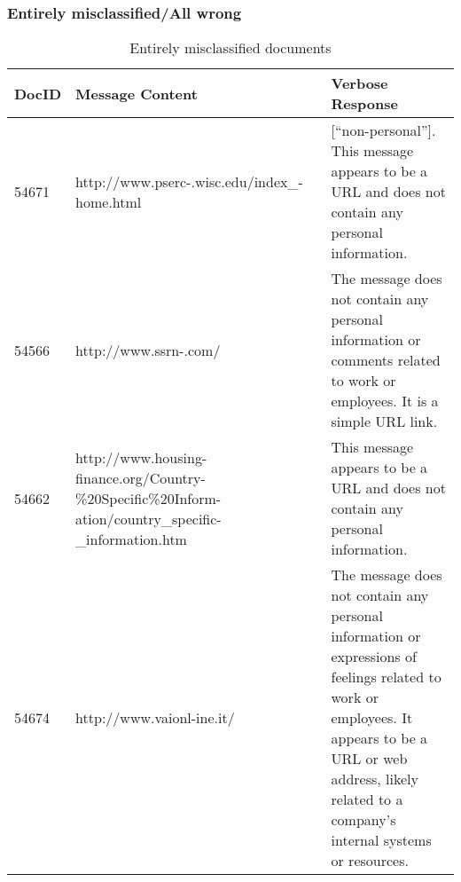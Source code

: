 \subsubsection{Entirely misclassified/All wrong} 
\begin{table}[!htb]
\caption{Entirely misclassified documents}
\label{table:all_wrong}
\begin{tabular}{@{}p{0.25in}p{1.2in}p{2in}@{}}
\toprule
DocID &
  Message Content &
  Verbose Response \\ \midrule
54671 &
  http://www.pserc-.wisc.edu/index\_-home.html &
  {[}“non-personal”{]}. This message appears to be a URL and does not contain any personal information. \\
54566 &
  http://www.ssrn-.com/ &
  The message does not contain any personal information or comments related to work or employees. It is a simple URL link. \\
54662 &
  http://www.housing-finance.org/Country-\%20Specific\%20Inform-ation/country\_specific-\_information.htm &
  This message appears to be a URL and does not contain any personal information. \\
54674 &
  http://www.vaionl-ine.it/ &
  The message does not contain any personal information or expressions of feelings related to work or employees. It appears to be a URL or web address, likely related to a company's internal systems or resources. \\ \bottomrule
\end{tabular}
\end{table}


